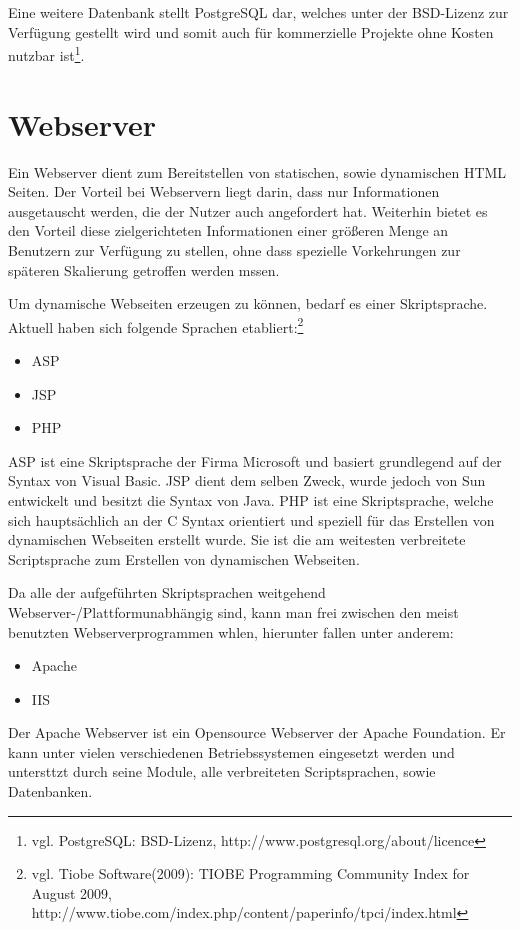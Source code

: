 Eine weitere Datenbank stellt PostgreSQL dar, welches unter der BSD-Lizenz zur Verfügung gestellt wird und somit auch für kommerzielle Projekte ohne Kosten nutzbar ist\footnote{vgl. PostgreSQL: BSD-Lizenz, http://www.postgresql.org/about/licence}.


\section{Webserver}
\label{sec:websrv}

Ein Webserver dient zum Bereitstellen von statischen, sowie dynamischen HTML Seiten.
Der Vorteil bei Webservern liegt darin, dass nur Informationen ausgetauscht werden, die der Nutzer auch angefordert hat.
Weiterhin bietet es den Vorteil diese zielgerichteten Informationen einer größeren Menge an Benutzern zur Verfügung zu stellen, ohne dass spezielle Vorkehrungen zur späteren Skalierung getroffen werden mssen.

Um dynamische Webseiten erzeugen zu können, bedarf es einer Skriptsprache.
Aktuell haben sich folgende Sprachen etabliert:\footnote{vgl. Tiobe Software(2009): TIOBE Programming Community Index for August 2009, http://www.tiobe.com/index.php/content/paperinfo/tpci/index.html}

\begin{itemize}
\item ASP
\item JSP
\item PHP
\end{itemize}

ASP ist eine Skriptsprache der Firma Microsoft und basiert grundlegend auf der Syntax von Visual Basic.
JSP dient dem selben Zweck, wurde jedoch von Sun entwickelt und besitzt die Syntax von Java.
PHP ist eine Skriptsprache, welche sich hauptsächlich an der C Syntax orientiert und speziell für das Erstellen von
dynamischen Webseiten erstellt wurde. Sie ist die am weitesten verbreitete Scriptsprache zum Erstellen von dynamischen Webseiten.

Da alle der aufgeführten Skriptsprachen weitgehend Webserver-/Plattformunabhängig sind, kann man frei zwischen den meist benutzten Webserverprogrammen whlen, hierunter fallen unter anderem:


\begin{itemize}
\item Apache
\item IIS
\end{itemize}

Der Apache Webserver ist ein Opensource Webserver der Apache Foundation.
Er kann unter vielen verschiedenen Betriebssystemen eingesetzt werden und untersttzt durch seine Module, alle verbreiteten Scriptsprachen, sowie Datenbanken.

